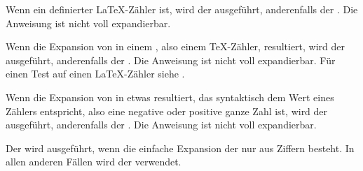 \begin{Declaration}
\end{Declaration}
Wenn
 ein definierter \LaTeX-Zähler ist, wird der 
ausgeführt, anderenfalls der . Die Anweisung ist nicht voll
expandierbar.%
\iffalse%
\iftrue%
\ Von dieser Anweisung gibt es keine interne Variante.%
\else%
\ Es gibt keine interne Variante.%
\fi%
\fi%
\EndIndexGroup


\begin{Declaration}
\end{Declaration}
Wenn
die Expansion von  in einem , also einem \TeX-Zähler,
resultiert, wird der  ausgeführt, anderenfalls der
. Die Anweisung ist nicht voll expandierbar. Für einen Test
auf einen \LaTeX-Zähler siehe .%
\iffalse%
\iftrue%
\ Von dieser Anweisung gibt es keine interne Variante.%
\else%
\ Es gibt keine interne Variante.%
\fi%
\fi%
\EndIndexGroup


\begin{Declaration}
\end{Declaration}
Wenn
die Expansion von  in etwas resultiert, das syntaktisch dem Wert
eines Zählers entspricht, also eine negative oder positive ganze Zahl ist,
wird der  ausgeführt, anderenfalls der
. Die Anweisung ist nicht voll expandierbar.%
\iffalse%
\iftrue%
\ Von dieser Anweisung gibt es keine interne Variante.%
\else%
\ Es gibt keine interne Variante.%
\fi%
\fi%
\EndIndexGroup


\begin{Declaration}
\end{Declaration}
Der  wird ausgeführt,
wenn die einfache Expansion der  nur aus Ziffern
besteht. In allen anderen Fällen wird der  verwendet.%
\iffalse%
\iftrue%
\ Von dieser Anweisung gibt es keine interne Variante.%
\else%
\ Es gibt keine interne Variante.%
\fi%
\fi%
\EndIndexGroup


